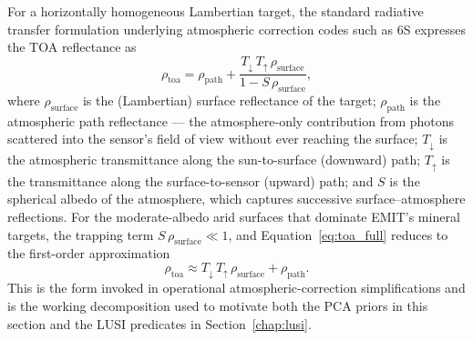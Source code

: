 \documentclass[11pt]{report}
\begin{document}
For a horizontally homogeneous Lambertian target, the standard radiative transfer formulation underlying atmospheric correction codes such as 6S \cite{vermote1997sixs} expresses the TOA reflectance as
\begin{equation}
\rho_{\text{toa}}
=
\rho_{\text{path}}
+
\frac{T_{\downarrow}\,T_{\uparrow}\,\rho_{\text{surface}}}{1 - S\,\rho_{\text{surface}}},
\label{eq:toa_full}
\end{equation}
where $\rho_{\text{surface}}$ is the (Lambertian) surface reflectance of the target; $\rho_{\text{path}}$ is the atmospheric path reflectance --- the atmosphere-only contribution from photons scattered into the sensor's field of view without ever reaching the surface; $T_{\downarrow}$ is the atmospheric transmittance along the sun-to-surface (downward) path; $T_{\uparrow}$ is the transmittance along the surface-to-sensor (upward) path; and $S$ is the spherical albedo of the atmosphere, which captures successive surface--atmosphere reflections. For the moderate-albedo arid surfaces that dominate EMIT's mineral targets, the trapping term $S\,\rho_{\text{surface}} \ll 1$, and Equation~\ref{eq:toa_full} reduces to the first-order approximation
\begin{equation}
\rho_{\text{toa}} \approx T_{\downarrow}\,T_{\uparrow}\,\rho_{\text{surface}} + \rho_{\text{path}}.
\label{eq:toa_decomp}
\end{equation}
This is the form invoked in operational atmospheric-correction simplifications \cite{richter_atcor_atbd} and is the working decomposition used to motivate both the PCA priors in this section and the LUSI predicates in Section~\ref{chap:lusi}.
\end{document}
